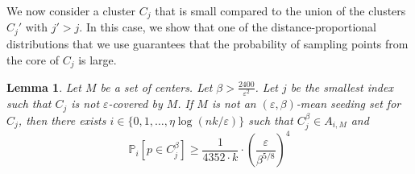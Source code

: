 \documentclass[11pt]{article}
\newtheorem{lemma}[theorem]{Lemma}
\newcommand{\cs}[1]{{\textcolor{red}{#1}}{}}
\begin{document}
We now consider a cluster $C_j$ that is small compared to the union of the clusters $C_j'$ with $j'>j$. In this case, we show that one of the distance-proportional distributions that we use guarantees that the probability of sampling points from the core of $C_j$ is large.

\begin{lemma}
\label{lem:refinedsample}
 Let $M$ be a set of centers. Let $\beta> \frac{2400}{\varepsilon^{2}}$. Let $j$ be the smallest index 
 such that $C_j$ is not $\varepsilon$-covered by $M$. If $M$ is not an $(\varepsilon,\beta)$-mean seeding
 set for $C_j$, then there exists $i\in \{0,1,\ldots,\eta\log (nk/\varepsilon)\}$ such that 
 $C_j^\beta \in A_{i,M}$ and
$$\mathbb{P}_i[p\in C_j^\beta]\geq \frac{1}{4352\cdot k}\cdot \left(\frac{\varepsilon}{\beta^{5/8}}\right)^4$$
\end{lemma}
\end{document}
